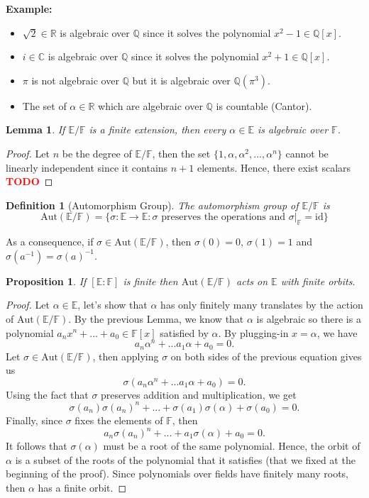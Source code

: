 \documentclass{article}
\newtheorem*{proposition}{Proposition}
\newtheorem*{lemma}{Lemma}
\newtheorem*{definition}{Definition}
\newcommand{\C}{\mathbb{C}}
\newcommand{\R}{\mathbb{R}}
\newcommand{\Q}{\mathbb{Q}}
\newcommand{\F}{\mathbb{F}}
\newcommand{\E}{\mathbb{E}}
\newcommand{\Aut}{\text{Aut}}
\newcommand{\td}{\textcolor{red}{\textbf{TODO}}}
\newenvironment{example}{\noindent\textbf{Example:} \vspace{-0.2cm}\begin{itemize}}{\end{itemize}}
\begin{document}
\begin{example}
    \item $\sqrt{2} \in \R$ is algebraic over $\Q$ since it solves the polynomial $x^2 - 1 \in \Q[x]$.
    \item $i \in \C$ is algebraic over $\Q$ since it solves the polynomial $x^2 + 1 \in \Q[x]$.
    \item $\pi$ is not algebraic over $\Q$ but it is algebraic over $\Q(\pi^3)$.
    \item The set of $\alpha \in \R$ which are algebraic over $\Q$ is countable (Cantor).
\end{example}

\begin{lemma}
    If $\E / \F$ is a finite extension, then every $\alpha \in \E$ is algebraic over $\F$.
\end{lemma}

\begin{proof}
    Let $n$ be the degree of $\E / \F$, then the set $\{1, \alpha, \alpha^2, ..., \alpha^n\}$ cannot be linearly independent since it contains $n+1$ elements. Hence, there exist scalars \td 
\end{proof}

\begin{definition}[Automorphism Group]
    The automorphism group of $\E / \F$ is
    $$\Aut(\E / \F) = \{\sigma: \E \to \E : \sigma \text{ preserves the operations and } \sigma|_{\F} = \text{id} \}$$
\end{definition}

As a consequence, if $\sigma \in \Aut(\E / \F)$, then $\sigma(0) = 0$, $\sigma(1) = 1$ and $\sigma(a^{-1}) = \sigma(a)^{-1}$.

\begin{proposition}
    If $[\E : \F]$ is finite then $\Aut(\E / \F)$ acts on $\E$ with finite orbits.
\end{proposition}

\begin{proof}
    Let $\alpha \in \E$, let's show that $\alpha$ has only finitely many translates by the action of $\Aut(\E / \F)$. By the previous Lemma, we know that $\alpha$ is algebraic so there is a polynomial $a_n x^n + ... + a_0 \in \F[x]$ satisfied by $\alpha$.  By plugging-in $x = \alpha$, we have
    $$a_n \alpha^n + ... a_1 \alpha + a_0 = 0.$$
    Let $\sigma \in \Aut(\E / \F)$, then applying $\sigma$ on both sides of the previous equation gives us 
    $$\sigma(a_n \alpha^n + ... a_1 \alpha + a_0) = 0.$$
    Using the fact that $\sigma$ preserves addition and multiplication, we get
    $$\sigma(a_n)\sigma(a_n)^n + ... + \sigma(a_1)\sigma(\alpha) + \sigma(a_0) = 0.$$
    Finally, since $\sigma$ fixes the elements of $\F$, then 
    $$a_n\sigma(a_n)^n + ... + a_1\sigma(\alpha) + a_0 = 0.$$
    It follows that $\sigma(\alpha)$ must be a root of the same polynomial. Hence, the orbit of $\alpha$ is a subset of the roots of the polynomial that it satisfies (that we fixed at the beginning of the proof). Since polynomials over fields have finitely many roots, then $\alpha$ has a finite orbit.
\end{proof}
\end{document}
